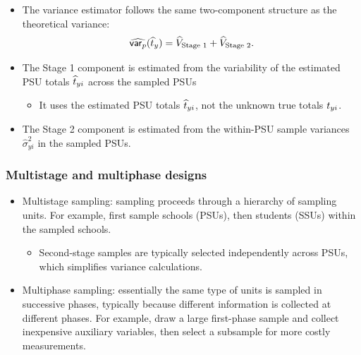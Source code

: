 \documentclass{my_eth_beamer}
\numberwithin{equation}{section}
\begin{document}
\begin{frame}
    \begin{itemize}
    \setlength{\itemsep}{12pt}
        \item The variance estimator follows the same \alert{two-component
            structure} as the theoretical variance:
            \begin{equation*}
                \widehat{\mathsf{var}_p}(\widehat{t}_y)
                =
                \widehat V_{\text{Stage 1}}
                +
                \widehat V_{\text{Stage 2}}.
            \end{equation*}
            \item The \alert{Stage 1} component is estimated from the
                variability of the estimated PSU totals $\widehat{t}_{yi}$ across the
                sampled PSUs
                \vspace{0.25em}
                \begin{itemize}
                \setlength{\itemsep}{8pt}
                    \item[\goto] It uses the estimated PSU totals $\widehat{t}_{yi}$, not
                        the unknown true totals $t_{yi}$.
                \end{itemize}
            \item The \alert{Stage 2} component is estimated from the
                within-PSU sample variances $\widehat{\sigma}_{yi}^2$ in the
                sampled PSUs.
    \end{itemize}
\end{frame}

\begin{frame}
    \frametitle{\normalsize{Multistage and multiphase designs}}
    \begin{itemize}
    \setlength{\itemsep}{12pt}
        \item \alert{Multistage sampling:} sampling proceeds through a
            \alert{hierarchy} of sampling units. For example, first sample
            schools (PSUs), then students (SSUs) within the sampled schools.
            \vspace{0.25em}
            \begin{itemize}
            \setlength{\itemsep}{8pt}
                \item[\goto] Second-stage samples are typically selected
                    independently across PSUs, which simplifies variance
                    calculations.
            \end{itemize}
    \item \alert{Multiphase sampling:} essentially the same type of units
        is sampled in successive phases, typically because different
        information is collected at different phases. For example, draw a
        large first-phase sample and collect inexpensive auxiliary
        variables, then select a subsample for more costly measurements.
    \end{itemize}
\end{frame}
\end{document}
